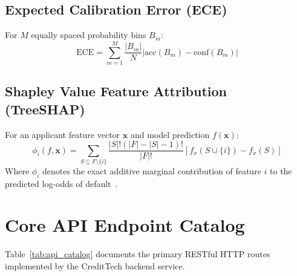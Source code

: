 \documentclass[11pt,a4paper,oneside]{report}
\begin{document}
\subsection{Expected Calibration Error (ECE)}
For $M$ equally spaced probability bins $B_m$:
$$\text{ECE} = \sum_{m=1}^{M} \frac{|B_m|}{N} \left| \text{acc}(B_m) - \text{conf}(B_m) \right|$$

\subsection{Shapley Value Feature Attribution (TreeSHAP)}
For an applicant feature vector $\mathbf{x}$ and model prediction $f(\mathbf{x})$:
$$\phi_i(f, \mathbf{x}) = \sum_{S \subseteq F \setminus \{i\}} \frac{|S|!(|F| - |S| - 1)!}{|F|!} \left[ f_x(S \cup \{i\}) - f_x(S) \right]$$
Where $\phi_i$ denotes the exact additive marginal contribution of feature $i$ to the predicted log-odds of default~\cite{lundberg_shap_2017}.

\section{Core API Endpoint Catalog}
Table~\ref{tab:api_catalog} documents the primary RESTful HTTP routes implemented by the CreditTech backend service.
\end{document}
